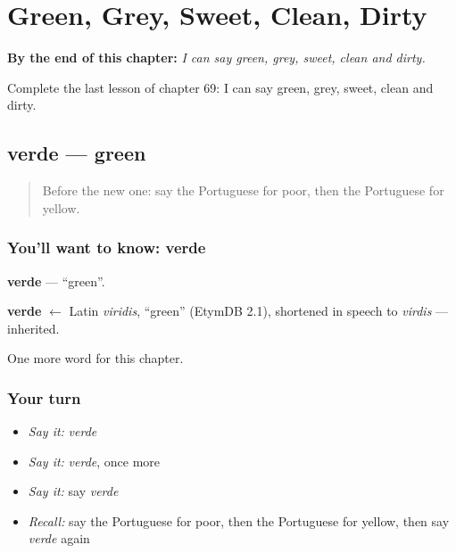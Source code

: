
\chapter{Green, Grey, Sweet, Clean, Dirty}
\label{ch:pt-green-grey-sweet-clean-dirty}

\begin{chapteropening}
\textbf{By the end of this chapter:} \emph{I can say green, grey, sweet, clean and dirty.}

Complete the last lesson of chapter 69: I can say green, grey, sweet, clean and dirty.
\end{chapteropening}

\section[verde]{verde — green}

\label{lesson:PT-C69-verde}



\begin{quote}
Before the new one: say the Portuguese for poor, then the Portuguese for yellow.
\end{quote}

\subsection*{You'll want to know: verde}
\textbf{verde} — \textquotedblleft{}green\textquotedblright{}.

\begin{cousinweb}
\textbf{verde} $\leftarrow$ Latin \emph{viridis}, \textquotedblleft{}green\textquotedblright{} (EtymDB 2.1), shortened in speech to \emph{virdis} — inherited.
\end{cousinweb}

\begin{grammarlens}[title={What you've built}]
One more word for this chapter.
\end{grammarlens}

\subsection*{Your turn}
\begin{itemize}
\raggedright
  \item \emph{Say it:} \emph{verde}
  \item \emph{Say it:} \emph{verde}, once more
  \item \emph{Say it:} say \emph{verde}
  \item \emph{Recall:} say the Portuguese for poor, then the Portuguese for yellow, then say \emph{verde} again
\end{itemize}


